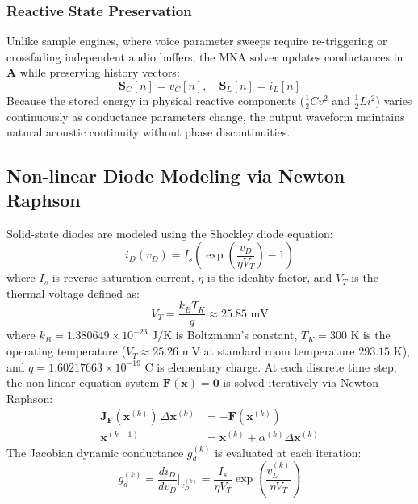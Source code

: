 \documentclass[fleqn,final]{jaes}
\begin{document}
\subsubsection{Reactive State Preservation}
Unlike sample engines, where voice parameter sweeps require re-triggering or crossfading independent audio buffers, the MNA solver updates conductances in $\mathbf{A}$ while preserving history vectors:
\begin{equation}
\mathbf{S}_C[n] = v_C[n], \quad \mathbf{S}_L[n] = i_L[n]
\end{equation}
Because the stored energy in physical reactive components ($\frac{1}{2}Cv^2$ and $\frac{1}{2}Li^2$) varies continuously as conductance parameters change, the output waveform maintains natural acoustic continuity without phase discontinuities.

\subsection{Non-linear Diode Modeling via Newton--Raphson}
Solid-state diodes are modeled using the Shockley diode equation:
\begin{equation}
i_D(v_D) = I_s \left( \exp\left(\frac{v_D}{\eta V_T}\right) - 1 \right)
\end{equation}
where $I_s$ is reverse saturation current, $\eta$ is the ideality factor, and $V_T$ is the thermal voltage defined as:
\begin{equation}
V_T = \frac{k_B T_K}{q} \approx 25.85\text{ mV}
\end{equation}
where $k_B = 1.380649 \times 10^{-23}\text{ J/K}$ is Boltzmann's constant, $T_K = 300\text{ K}$ is the operating temperature ($V_T \approx 25.26\text{ mV}$ at standard room temperature $293.15\text{ K}$), and $q = 1.60217663 \times 10^{-19}\text{ C}$ is elementary charge. At each discrete time step, the non-linear equation system $\mathbf{F}(\mathbf{x}) = \mathbf{0}$ is solved iteratively via Newton--Raphson:
\begin{align}
\mathbf{J}_{\mathbf{F}}(\mathbf{x}^{(k)}) \, \Delta \mathbf{x}^{(k)} &= - \mathbf{F}(\mathbf{x}^{(k)}) \\
\mathbf{x}^{(k+1)} &= \mathbf{x}^{(k)} + \alpha^{(k)} \Delta \mathbf{x}^{(k)}
\end{align}
The Jacobian dynamic conductance $g_d^{(k)}$ is evaluated at each iteration:
\begin{equation}
g_d^{(k)} = \frac{di_D}{dv_D}\Bigg|_{v_D^{(k)}} = \frac{I_s}{\eta V_T} \exp\left(\frac{v_D^{(k)}}{\eta V_T}\right)
\end{equation}
\end{document}

